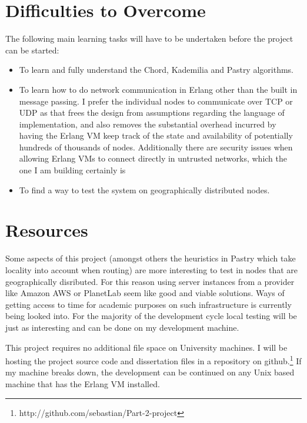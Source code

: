 \section*{Difficulties to Overcome}

The following main learning tasks will have to be undertaken before 
the project can be started:

\begin{itemize}

\item To learn and fully understand the Chord, Kademilia and Pastry algorithms.

\item To learn how to do network communication in Erlang other than the built in message passing. I prefer the individual nodes to communicate over TCP or UDP as that frees the design from assumptions regarding the language of implementation, and also removes the substantial overhead incurred by having the Erlang VM keep track of the state and availability of potentially hundreds of thousands of nodes. Additionally there are security issues when allowing Erlang VMs to connect directly in untrusted networks, which the one I am building certainly is

\item To find a way to test the system on geographically distributed nodes.

\end{itemize}


\section*{Resources}

Some aspects of this project (amongst others the heuristics in Pastry which take locality into account when routing) are more interesting to test in nodes that are geographically disributed. For this reason using server instances from a provider like Amazon AWS or PlanetLab seem like good and viable solutions. Ways of getting access to time for academic purposes on such infrastructure is currently being looked into. For the majority of the development cycle local testing will be just as interesting and can be done on my development machine.

This project requires no additional file space on University machines. I will be hosting the project source code and dissertation files in a repository on github.\footnote{http://github.com/sebastian/Part-2-project}
If my machine breaks down, the development can be continued on any Unix based machine that has the Erlang VM installed.

